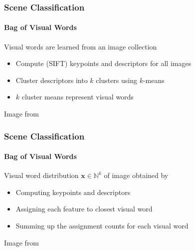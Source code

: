 \documentclass[xetex,professionalfont]{beamer}
\newcommand{\NN}{\mathbb{N}}
\renewcommand{\vec}[1]{\ensuremath{\mathbf{#1}}}
\newcommand{\vx}{\vec{x}}
\begin{document}

\begin{frame}
\frametitle{Scene Classification}
\framesubtitle{Bag of Visual Words}

Visual words are learned from an image collection
\begin{itemize}
    \item Compute (SIFT) keypoints and descriptors for all images
    \item Cluster descriptors into $k$ clusters using $k$-means %
    \item $k$ cluster means represent visual words
\end{itemize}

\medskip
\begin{center}
    {\centering Image from \cite{grauman2011}}
\end{center}

\end{frame}


\begin{frame}
\frametitle{Scene Classification}
\framesubtitle{Bag of Visual Words}

Visual word distribution $\vx\in\NN^k$ of image obtained by
\begin{itemize}
    \item Computing keypoints and descriptors
    \item Assigning each feature to closest visual word %
    \item Summing up the assignment counts for each visual word %
\end{itemize}

\medskip
\begin{center}
    {\centering Image from \cite{grauman2011}}
\end{center}

\end{frame}
\end{document}
